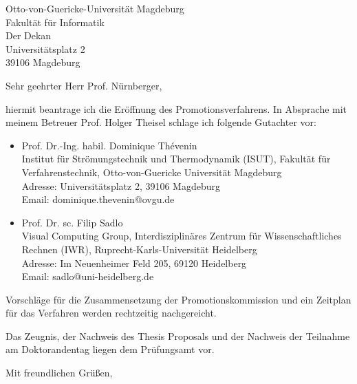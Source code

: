 \documentclass{scrlttr2}
\begin{document}
\begin{letter}{
    Otto-von-Guericke-Universität Magdeburg\\
    Fakultät für Informatik\\
    Der Dekan\\
    \vspace{0.5\baselineskip}
    Universitätsplatz 2\\
    39106 Magdeburg}

    \opening{Sehr geehrter Herr Prof. Nürnberger,}

    hiermit beantrage ich die Eröffnung des Promotionsverfahrens. In Absprache
    mit meinem Betreuer Prof. Holger Theisel schlage ich folgende Gutachter vor:

    \begin{itemize}
        \item Prof. Dr.-Ing. habil. Dominique Thévenin\\
              Institut für Strömungstechnik und Thermodynamik (ISUT), Fakultät
              für Verfahrenstechnik, Otto-von-Guericke Universität Magdeburg\\
              Adresse: Universitätsplatz 2, 39106 Magdeburg\\
              Email: dominique.thevenin@ovgu.de
        \item Prof. Dr. sc. Filip Sadlo\\
              Visual Computing Group, Interdisziplinäres Zentrum für
              Wissenschaftliches Rechnen (IWR), Ruprecht-Karls-Universität
              Heidelberg\\
              Adresse: Im Neuenheimer Feld 205, 69120 Heidelberg\\
              Email: sadlo@uni-heidelberg.de
    \end{itemize}

    Vorschläge für die Zusammensetzung der Promotionskommission und ein Zeitplan
    für das Verfahren werden rechtzeitig nachgereicht.

    Das Zeugnis, der Nachweis des Thesis Proposals und der Nachweis der
    Teilnahme am Doktorandentag liegen dem Prüfungsamt vor.

    \closing{Mit freundlichen Grüßen,}


\end{letter}
\end{document}

